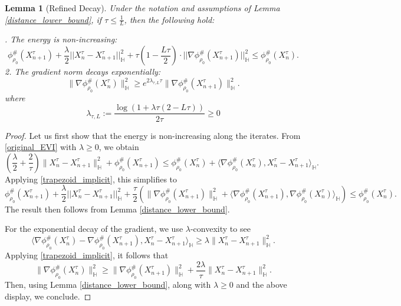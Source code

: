 \documentclass[11pt,a4paper]{amsart}
\newcommand{\1}{\mathds{1}}
\newtheorem{lemma}[theorem]{\textbf{Lemma}}
\numberwithin{equation}{section}
\begin{document}
\begin{lemma}[Refined Decay] \label{refined_decay}
Under the notation and assumptions of Lemma \ref{distance_lower_bound}, if $\tau \leq \frac{1}{L}$, then the following hold: \smallskip

. The energy is non-increasing:
\[
\phi^{\#}_{\rho_0}(X^{\tau}_{n+1}) +  \frac{\lambda}{2} ||X^{\tau}_n-X^{\tau}_{n+1}||^2_{\mathbb{H}} +  \tau\left(1- \frac{L \tau}{2} \right) \cdot ||\nabla \phi^{\#}_{\rho_0}(X^{\tau}_{n+1})||^2_{\mathbb{H}} \leq \phi^{\#}_{\rho_0}(X^{\tau}_n).
\]
2. The gradient norm decays exponentially:
\[
\|\nabla \phi^{\#}_{\rho_0}(X^{\tau}_n)\|^2_{\mathbb{H}} \geq e^{2\lambda_{\tau,L} \tau} \|\nabla \phi^{\#}_{\rho_0}(X^{\tau}_{n+1})\|^2_{\mathbb{H}}.
\] where
\begin{equation} \lambda_{\tau,L} := \frac{\log(1+\lambda\tau(2 - L \tau ))}{2 \tau} \geq 0 \label{lambda_tau_L}  \end{equation}
\end{lemma}

\begin{proof} Let us first show that the energy is non-increasing along the iterates. From \eqref{original_EVI} with $\lambda \geq 0$, we obtain
\[
\left( \frac{\lambda}{2}+\frac{2}{\tau} \right) \|X^{\tau}_n - X^{\tau}_{n+1}\|^2_{\mathbb{H}} 
+ \phi^{\#}_{\rho_0}(X^{\tau}_{n+1}) 
\leq \phi^{\#}_{\rho_0}(X^{\tau}_n) 
+ \langle \nabla \phi^{\#}_{\rho_0}(X_n^{\tau}), X^{\tau}_n - X^{\tau}_{n+1} \rangle_{\mathbb{H}}.
\]
Applying \eqref{trapezoid_implicit}, this simplifies to
\[
\phi^{\#}_{\rho_0}(X^{\tau}_{n+1}) 
+ \frac{\lambda}{2} ||X^{\tau}_n-X^{\tau}_{n+1}||^2_{\mathbb{H}} + \frac{\tau}{2} \left( \|\nabla \phi^{\#}_{\rho_0}(X^{\tau}_{n+1})\|^2_{\mathbb{H}} 
+ \langle \nabla \phi^{\#}_{\rho_0}(X^{\tau}_{n+1}), \nabla \phi^{\#}_{\rho_0}(X^{\tau}_{n}) \rangle_{\mathbb{H}} \right) 
\leq \phi^{\#}_{\rho_0}(X^{\tau}_n).
\]
The result then follows from Lemma \ref{distance_lower_bound}. \smallskip

For the exponential decay of the gradient, we use $\lambda$-convexity to see
\[
\langle \nabla \phi^{\#}_{\rho_0}(X^{\tau}_n) - \nabla \phi^{\#}_{\rho_0}(X^{\tau}_{n+1}), X^{\tau}_n - X^{\tau}_{n+1} \rangle_{\mathbb{H}} 
\geq \lambda \|X^{\tau}_n - X^{\tau}_{n+1}\|^2_{\mathbb{H}}.
\]
Applying \eqref{trapezoid_implicit}, it follows that
\[ \|\nabla \phi^{\#}_{\rho_0}(X^{\tau}_n)\|^2_{\mathbb{H}} 
\geq \|\nabla \phi^{\#}_{\rho_0}(X^{\tau}_{n+1})\|^2_{\mathbb{H}} 
+ \frac{2\lambda}{\tau} \|X^{\tau}_n - X^{\tau}_{n+1}\|^2_{\mathbb{H}}.
\]
Then, using Lemma \ref{distance_lower_bound}, along with $\lambda \geq 0$ and the above display, we conclude.
\end{proof}
\end{document}
